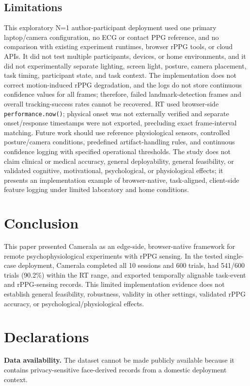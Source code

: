 \documentclass[dvipdfmx]{ehis}
\begin{document}
\subsection{Limitations}
This exploratory N=1 author-participant deployment used one primary laptop/camera configuration, no ECG or contact PPG reference, and no comparison with existing experiment runtimes, browser rPPG tools, or cloud APIs.
It did not test multiple participants, devices, or home environments, and it did not experimentally separate lighting, screen light, posture, camera placement, task timing, participant state, and task context.
The implementation does not correct motion-induced rPPG degradation, and the logs do not store continuous confidence values for all frames; therefore, failed landmark-detection frames and overall tracking-success rates cannot be recovered.
RT used browser-side \texttt{performance.now()}; physical onset was not externally verified and separate onset/response timestamps were not exported, precluding exact frame-interval matching.
Future work should use reference physiological sensors, controlled posture/camera conditions, predefined artifact-handling rules, and continuous confidence logging with specified operational thresholds.
The study does not claim clinical or medical accuracy, general deployability, general feasibility, or validated cognitive, motivational, psychological, or physiological effects; it presents an implementation example of browser-native, task-aligned, client-side feature logging under limited laboratory and home conditions.

\section{Conclusion}
This paper presented Camerala as an edge-side, browser-native framework for remote psychophysiological experiments with rPPG sensing.
In the tested single-case deployment, Camerala completed all 10 sessions and 600 trials, had 541/600 trials (90.2\%) within the RT range, and exported temporally alignable task-event and rPPG-sensing records.
This limited implementation evidence does not establish general feasibility, robustness, validity in other settings, validated rPPG accuracy, or psychological/physiological effects.

\enlargethispage{2\baselineskip}
\section*{Declarations}
\textbf{Data availability.}
The dataset cannot be made publicly available because it contains privacy-sensitive face-derived records from a domestic deployment context.
\end{document}
